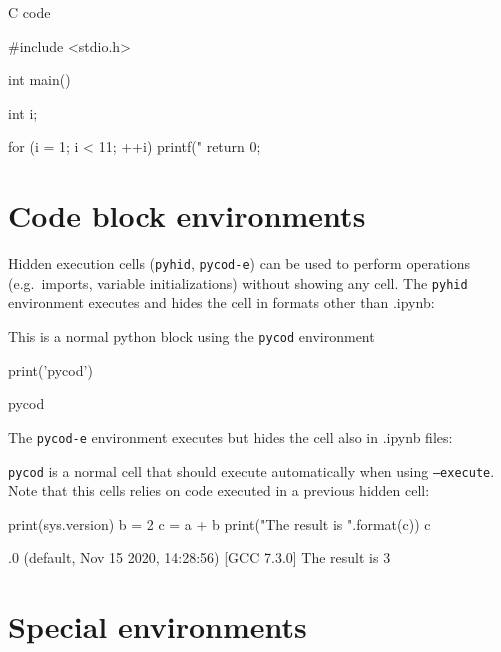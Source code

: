 \documentclass[%
oneside,                 %
final,                   %
chapterprefix=true,      %
open=right,              %
10pt]{book}
\begin{document}
\ehtml


C code












\bc
#include <stdio.h>

int main() {
  int i;

  for (i = 1; i < 11; ++i)
  {
    printf("%
  }
  return 0;
}

\ec


\section{Code block environments}

Hidden execution cells (\texttt{pyhid}, \texttt{pycod-e}) can be used to perform operations (e.g.~imports, variable initializations) without showing any cell.
The \texttt{pyhid} environment executes and hides the cell in formats other than .ipynb:

This is a normal python block using the \texttt{pycod} environment


\bpycod
print('pycod')

\epycod

\bpy
pycod
\epy







The \texttt{pycod-e} environment executes but hides the cell also in .ipynb files:







\texttt{pycod} is a normal cell that should execute automatically when using \texttt{--execute}. Note that this cells relies on code executed in a previous hidden cell:






\bpycod
print(sys.version)
b = 2
c = a + b
print("The result is {}".format(c))
c

\epycod

.0 (default, Nov 15 2020, 14:28:56) 
[GCC 7.3.0]
The result is 3
\epy
{}\epy

\section{Special environments}
\end{document}
